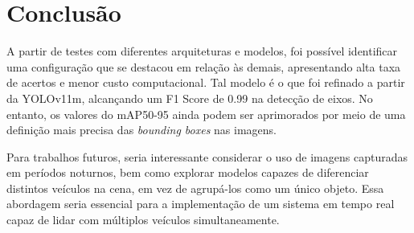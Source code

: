 \section{Conclusão}
    A partir de testes com diferentes arquiteturas e modelos, foi possível identificar uma configuração que se destacou em relação às demais, apresentando alta taxa de acertos e menor custo computacional. Tal modelo é o que foi refinado a partir da YOLOv11m, alcançando um F1 Score de 0.99 na detecção de eixos. No entanto, os valores do mAP50-95 ainda podem ser aprimorados por meio de uma definição mais precisa das \textit{bounding boxes} nas imagens.

    Para trabalhos futuros, seria interessante considerar o uso de imagens capturadas em períodos noturnos, bem como explorar modelos capazes de diferenciar distintos veículos na cena, em vez de agrupá-los como um único objeto. Essa abordagem seria essencial para a implementação de um sistema em tempo real capaz de lidar com múltiplos veículos simultaneamente.